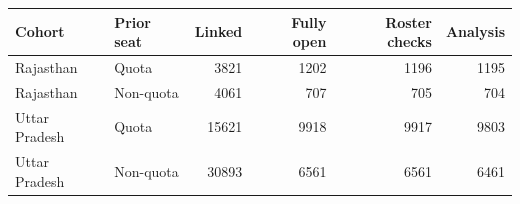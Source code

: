 \begin{tabular}{llrrrr}
\toprule
Cohort & Prior seat & Linked & Fully open & Roster checks & Analysis \\
\midrule
Rajasthan & Quota & 3821 & 1202 & 1196 & 1195 \\
Rajasthan & Non-quota & 4061 & 707 & 705 & 704 \\
Uttar Pradesh & Quota & 15621 & 9918 & 9917 & 9803 \\
Uttar Pradesh & Non-quota & 30893 & 6561 & 6561 & 6461 \\
\bottomrule
\end{tabular}

